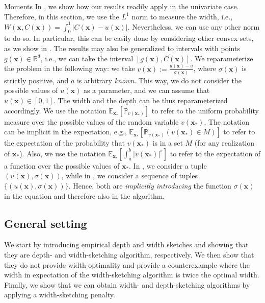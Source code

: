 \begin{assumptioni}[i.i.d data]
\begin{assumptioni}
\begin{assumptioni}{Moments}
In , we show how our results readily apply in the univariate case. Therefore, in this section, we use the $L^1$ norm to measure the width, i.e., $W(\bm{x},C(\bm{x})) = \int_0^1 |C(\bm{x}) - u(\bm{x})|$. Nevertheless, we can use any other norm to do so. In particular, this can be easily done by considering other convex sets, as we show in . The results may also be generalized to intervals with points $g(\bm{x}) \in \mathbb{R}^d$, i.e., we can take the interval $[g(\bm{x}),C(\bm{x})]$. We reparameterize the problem in the following way: we take $v(\bm{x}) := \frac{u(\bm{x}) - a}{\sigma(\bm{x})}$, where $\sigma(\bm{x})$ is strictly positive, and $a$ is arbitrary \emph{known}. This way, we do not consider the possible values of $u(\bm{x})$ as a parameter, and we can assume that $u(\bm{x}) \in [0,1]$. 
The width and the depth can be thus reparameterized accordingly. 
We use the notation $\mathbb{E}_{\bm{x}_*}[\mathbb{P}_{v(\bm{x_*})}]$ to refer to the uniform probability measure over the possible values of the random variable $v(\bm{x_*})$. 
The notation can be implicit in the expectation, e.g., $\mathbb{E}_{\bm{x}_*}[\mathbb{P}_{v(\bm{x_*})}(v(\bm{x_*}) \in M)]$ to refer to the expectation of the probability that $v(\bm{x_*})$ is in a set $M$ (for any realization of $\bm{x_*}$). 
Also, we use the notation $\mathbb{E}_{\bm{x}_*}[\int_{a}^{b} |v(\bm{x_*})|^{s}]$ to refer to the expectation of a function over the possible values of $\bm{x_*}$. 
In , we consider a tuple $(u(\bm{x}), \sigma(\bm{x}))$, while in , we consider a sequence of tuples $\{(u(\bm{x}), \sigma(\bm{x}))\}$. 
Hence, both  are \emph{implicitly introducing} the function $\sigma(\bm{x})$ in the equation and therefore also in the algorithm.

\subsection{General setting} 
We start by introducing empirical depth and width sketches and showing that they are depth- and width-sketching algorithm, respectively. We then show that they do not provide width-optimality and provide a counterexample where the width in expectation of the width-sketching algorithm is twice the optimal width. Finally, we show that we can obtain width- and depth-sketching algorithms by applying a width-sketching penalty.

\end{assumptioni}
\end{assumptioni}
\end{assumptioni}
